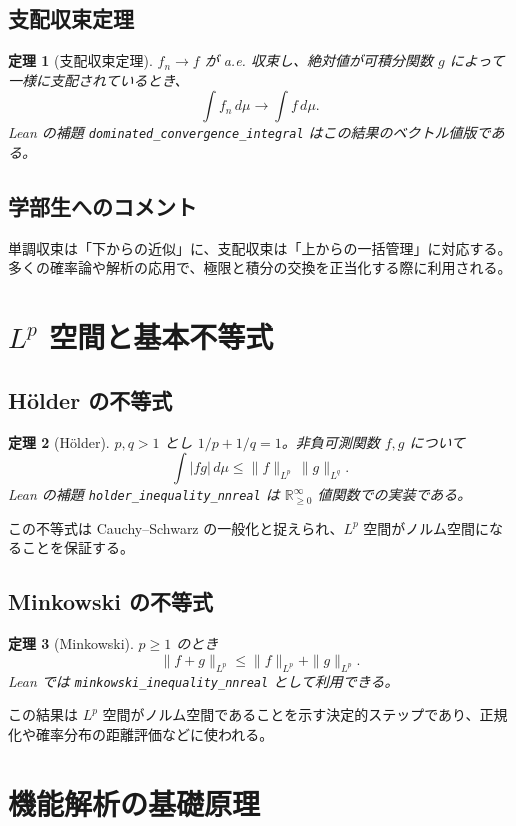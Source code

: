 \documentclass[a4paper]{ltjsarticle}
\theoremstyle{definition}
\theoremstyle{plain}
\newtheorem{theorem}{定理}[section]
\begin{document}
\subsection{支配収束定理}
\begin{theorem}[支配収束定理]
$f_n \to f$ が a.e. 収束し、絶対値が可積分関数 $g$ によって一様に支配されているとき、
\[\int f_n \, d\mu \to \int f \, d\mu.\]
Lean の補題 \texttt{dominated\_convergence\_integral} はこの結果のベクトル値版である。
\end{theorem}

\subsection{学部生へのコメント}
単調収束は「下からの近似」に、支配収束は「上からの一括管理」に対応する。多くの確率論や解析の応用で、極限と積分の交換を正当化する際に利用される。

\section{$L^p$ 空間と基本不等式}

\subsection{Hölder の不等式}
\begin{theorem}[Hölder]
$p,q>1$ とし $1/p+1/q=1$。非負可測関数 $f,g$ について
\[
\int |fg| \, d\mu \le \|f\|_{L^p}\,\|g\|_{L^q}.
\]
Lean の補題 \texttt{holder\_inequality\_nnreal} は $\mathbb{R}_{\ge 0}^\infty$ 値関数での実装である。
\end{theorem}

この不等式は Cauchy--Schwarz の一般化と捉えられ、$L^p$ 空間がノルム空間になることを保証する。

\subsection{Minkowski の不等式}
\begin{theorem}[Minkowski]
$p \ge 1$ のとき
\[
\|f+g\|_{L^p} \le \|f\|_{L^p} + \|g\|_{L^p}.
\]
Lean では \texttt{minkowski\_inequality\_nnreal} として利用できる。
\end{theorem}

この結果は $L^p$ 空間がノルム空間であることを示す決定的ステップであり、正規化や確率分布の距離評価などに使われる。

\section{機能解析の基礎原理}
\end{document}
